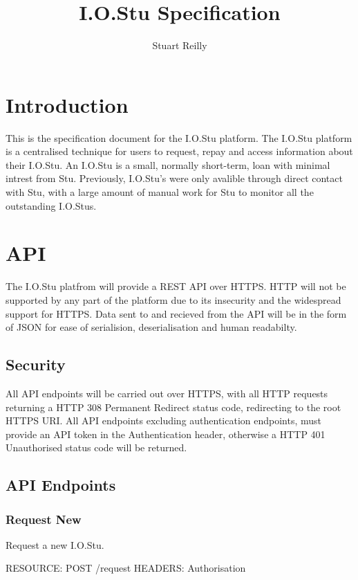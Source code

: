 \documentclass[12pt]{article}
\begin{document}
\title{I.O.Stu Specification}
\author{Stuart Reilly}
\maketitle
\newpage

\section{Introduction}
    This is the specification document for the I.O.Stu platform.
    The I.O.Stu platform is a centralised technique for users to request, repay and access information about their I.O.Stu.
    An I.O.Stu is a small, normally short-term, loan with minimal intrest from Stu.
    Previously, I.O.Stu's were only avalible through direct contact with Stu, with a large amount of manual work for Stu to monitor all the outstanding I.O.Stus.

\section{API}
    The I.O.Stu platfrom will provide a REST API over HTTPS.
    HTTP will not be supported by any part of the platform due to its insecurity and the widespread support for HTTPS.
    Data sent to and recieved from the API will be in the form of JSON for ease of serialision, deserialisation and human readabilty.

    \subsection{Security}
    All API endpoints will be carried out over HTTPS, with all HTTP requests returning a HTTP 308 Permanent Redirect status code, redirecting to the root HTTPS URI.
    All API endpoints excluding authentication endpoints, must provide an API token in the Authentication header, otherwise a HTTP 401 Unauthorised status code will be returned.
    

    \subsection{API Endpoints}
        \subsubsection{Request New}
        Request a new I.O.Stu.

        RESOURCE: POST /request
        HEADERS: Authorisation
\end{document}
